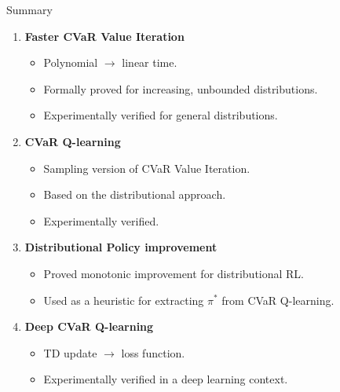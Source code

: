 \documentclass{beamer}
\begin{document}

\begin{frame}{Summary}
\begin{enumerate}
\item \textbf{Faster CVaR Value Iteration} 
\begin{itemize}
\item Polynomial $\to$ linear time.
\item Formally proved for increasing, unbounded distributions.
\item Experimentally verified for general distributions.
\end{itemize}
\item \textbf{CVaR Q-learning} 
\begin{itemize}
\item Sampling version of CVaR Value Iteration.
\item Based on the distributional approach.
\item Experimentally verified.
\end{itemize}
\item \textbf{Distributional Policy improvement}
\begin{itemize}
\item Proved monotonic improvement for distributional RL.
\item Used as a heuristic for extracting $\pi^*$ from CVaR Q-learning.
\end{itemize}
\item \textbf{Deep CVaR Q-learning}
\begin{itemize}
\item TD update $\to$ loss function.
\item Experimentally verified in a deep learning context.
\end{itemize}
\end{enumerate}
\end{frame}


%
\end{document}
